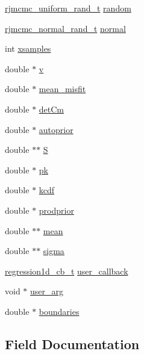 \begin{DoxyCompactItemize}
\item 
\hyperlink{rjmcmc__random_8h_accc36e83459ada552d8f70962190dac0}{rjmcmc\+\_\+uniform\+\_\+rand\+\_\+t} \hyperlink{structsingle1d_a1c0d7a1f68bb353fb706ed2b995ea177}{random}
\item 
\hyperlink{rjmcmc__random_8h_a498625755d377b68ad37c9ab360e83b0}{rjmcmc\+\_\+normal\+\_\+rand\+\_\+t} \hyperlink{structsingle1d_ad653c8600bea466a1b101a989b215530}{normal}
\item 
int \hyperlink{structsingle1d_aa0bcbb099a7182df190a633e5d35e39e}{xsamples}
\item 
double $\ast$ \hyperlink{structsingle1d_af632579085cb96d69c3a0aed604fbf35}{v}
\item 
double $\ast$ \hyperlink{structsingle1d_a9b27da0ce7a852baa94a71a218103faf}{mean\+\_\+misfit}
\item 
double $\ast$ \hyperlink{structsingle1d_a4d65180611fcf02ef3820133fd49a96d}{det\+Cm}
\item 
double $\ast$ \hyperlink{structsingle1d_a802abe6c87cc2ba23412f106b757739f}{autoprior}
\item 
double $\ast$$\ast$ \hyperlink{structsingle1d_a651ccbbb8afaab5ef0b576213e645367}{S}
\item 
double $\ast$ \hyperlink{structsingle1d_a01401cf7bb4ae9f5248a5a22d9d3c31d}{pk}
\item 
double $\ast$ \hyperlink{structsingle1d_ad2a5bfd532c995e41650068e8b814f3e}{kcdf}
\item 
double $\ast$ \hyperlink{structsingle1d_ad19769e913ffae67be78d12260c8da65}{prodprior}
\item 
double $\ast$$\ast$ \hyperlink{structsingle1d_a0ea2ba7f58645cefcfc9ce5d4a602976}{mean}
\item 
double $\ast$$\ast$ \hyperlink{structsingle1d_a0fa0ddbd90b9dab4553716156649d29c}{sigma}
\item 
\hyperlink{regression_8h_ae892a560d7749e7aa48352b053c54a26}{regression1d\+\_\+cb\+\_\+t} \hyperlink{structsingle1d_a83e79837c3f754a9f977afa5e8b1345a}{user\+\_\+callback}
\item 
void $\ast$ \hyperlink{structsingle1d_a4a82ae9e8e87fd133b367a148ad4df8b}{user\+\_\+arg}
\item 
double $\ast$ \hyperlink{structsingle1d_a8b9a4b875f71341ef2bbfc58c59b526e}{boundaries}
\end{DoxyCompactItemize}


\subsection{Field Documentation}
